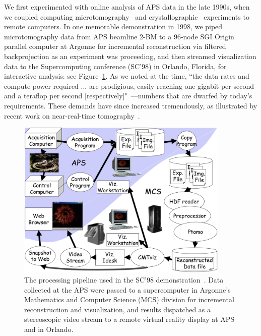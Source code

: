 \documentclass{aip-cp}
\begin{document}
We first experimented with online analysis of APS data in the late 1990s, 
when we coupled 
computing microtomography~\cite{wang1999quasi,wang2001high} and crystallographic~\cite{von2000using}
experiments to remote computers.
In one memorable demonstration in 1998, we piped microtomography data from APS beamline 2-BM to a 
96-node SGI Origin parallel computer 
at Argonne for incremental reconstruction via filtered backprojection as an experiment was 
proceeding,
and then streamed visualization data to the Supercomputing conference (SC'98) in Orlando, Florida, 
for interactive analysis: see Figure~\ref{fig:sc98}. 
As we noted at the time, 
``the data rates and compute power required ... are prodigious, easily reaching one gigabit per 
second and a teraflop per second [respectively]"~\cite{von2000real}---numbers that are dwarfed by 
today's requirements. 
These demands have since increased tremendously, as illustrated by recent work on near-real-time tomography~\cite{Bicer_Europar15,bicer2017real,thomas2015towards}.

\begin{figure}[h]
  \centerline{\includegraphics[width=4in]{Figs/APS-Fig.png}}
  \caption{The processing pipeline used in the SC'98 demonstration~\cite{von2000real}. Data 
collected at the APS 
  were passed to a supercomputer in Argonne's Mathematics and Computer Science (MCS) division for
  incremental reconstruction and visualization, and results dispatched as a stereoscopic
  video stream to a remote virtual reality display at APS and in Orlando.\label{fig:sc98}}
\end{figure}
\end{document}
